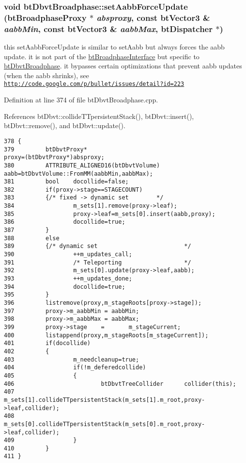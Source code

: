\hypertarget{structbt_dbvt_broadphase_645dd617d0bbe7767859f424e2ee18c1}{
\subsubsection[setAabbForceUpdate]{\setlength{\rightskip}{0pt plus 5cm}void btDbvtBroadphase::setAabbForceUpdate (btBroadphaseProxy $\ast$ {\em absproxy}, \/  const btVector3 \& {\em aabbMin}, \/  const btVector3 \& {\em aabbMax}, \/  {\bf btDispatcher} $\ast$)}}
\label{structbt_dbvt_broadphase_645dd617d0bbe7767859f424e2ee18c1}


this setAabbForceUpdate is similar to setAabb but always forces the aabb update. it is not part of the \hyperlink{classbt_broadphase_interface}{btBroadphaseInterface} but specific to \hyperlink{structbt_dbvt_broadphase}{btDbvtBroadphase}. it bypasses certain optimizations that prevent aabb updates (when the aabb shrinks), see \href{http://code.google.com/p/bullet/issues/detail?id=223}{\tt http://code.google.com/p/bullet/issues/detail?id=223} 

Definition at line 374 of file btDbvtBroadphase.cpp.

References btDbvt::collideTTpersistentStack(), btDbvt::insert(), btDbvt::remove(), and btDbvt::update().

\begin{Code}\begin{verbatim}378 {
379         btDbvtProxy*                                            proxy=(btDbvtProxy*)absproxy;
380         ATTRIBUTE_ALIGNED16(btDbvtVolume)       aabb=btDbvtVolume::FromMM(aabbMin,aabbMax);
381         bool    docollide=false;
382         if(proxy->stage==STAGECOUNT)
383         {/* fixed -> dynamic set        */ 
384                 m_sets[1].remove(proxy->leaf);
385                 proxy->leaf=m_sets[0].insert(aabb,proxy);
386                 docollide=true;
387         }
388         else
389         {/* dynamic set                         */ 
390                 ++m_updates_call;
391                 /* Teleporting                  */ 
392                 m_sets[0].update(proxy->leaf,aabb);
393                 ++m_updates_done;
394                 docollide=true;
395         }
396         listremove(proxy,m_stageRoots[proxy->stage]);
397         proxy->m_aabbMin = aabbMin;
398         proxy->m_aabbMax = aabbMax;
399         proxy->stage    =       m_stageCurrent;
400         listappend(proxy,m_stageRoots[m_stageCurrent]);
401         if(docollide)
402         {
403                 m_needcleanup=true;
404                 if(!m_deferedcollide)
405                 {
406                         btDbvtTreeCollider      collider(this);
407                         m_sets[1].collideTTpersistentStack(m_sets[1].m_root,proxy->leaf,collider);
408                         m_sets[0].collideTTpersistentStack(m_sets[0].m_root,proxy->leaf,collider);
409                 }
410         }       
411 }
\end{verbatim}
\end{Code}




